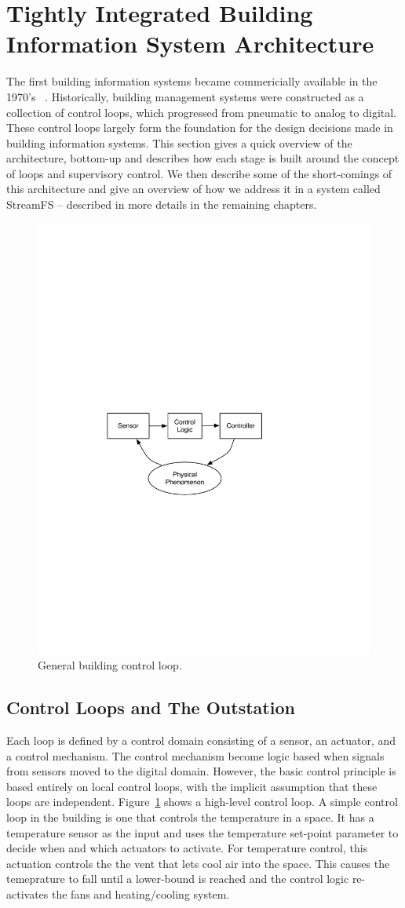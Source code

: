 \section{Tightly Integrated Building Information System Architecture}

The first building information systems became commericially available in the 1970's ~\cite{gardner1987energy}.  
Historically, building management 
systems were constructed as a collection of control loops, which progressed from pneumatic to analog to digital.
These control loops largely form the foundation for the design decisions made in building information systems.  
This section gives a quick overview of the architecture, bottom-up and describes how each stage is built around
the concept of loops and supervisory control.  We then describe some of the short-comings of this architecture
and give an overview of how we address it in a system called StreamFS -- described in more details in
the remaining chapters.

\begin{figure}[t!] %
\centering
\includegraphics[width=0.50\columnwidth]{figs/control_loop}
\caption{General building control loop.}
\label{fig:control_loop}
\end{figure}

\subsection{Control Loops and The Outstation}
\label{sec:control_loops}
Each loop is defined by a control domain consisting of a sensor, an actuator, and a control mechanism.  The control mechanism
become logic based when signals from sensors moved to the digital domain.  However, the basic control principle is based
entirely on local control loops, with the implicit assumption that these loops are independent.
Figure~\ref{fig:control_loop} shows a high-level control loop.  A simple control loop in the building is one that controls
the temperature in a space.  It has a temperature sensor as the input and uses the temperature set-point parameter to 
decide when and which actuators to activate.
For temperature control, this actuation controls the the vent that lets cool air into the space.  This causes the temeprature
to fall until a lower-bound is reached and the control logic re-activates the fans and heating/cooling system.

